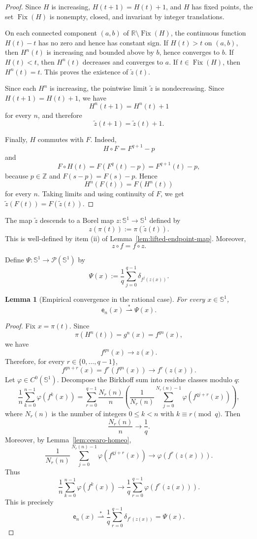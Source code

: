 \documentclass[12pt,a4paper,twoside]{article}
\theoremstyle{plain}
\newtheorem{lemma}[theorem]{Lemma}
\theoremstyle{definition}
\newcommand{\cP}{{\mathcal P}}
\newcommand{\emp}{\mathsf e}
\newcommand{\wto}{\overset{*}{\rightharpoonup}}
\begin{document}
\begin{proof}
Since \(H\) is increasing, \(H(t+1)=H(t)+1\), and \(H\) has fixed points,
the set \(\operatorname{Fix}(H)\) is nonempty, closed, and invariant by
integer translations.

On each connected component \((a,b)\) of
\(\mathbb R\setminus\operatorname{Fix}(H)\), the continuous function
\(H(t)-t\) has no zero and hence has constant sign. If \(H(t)>t\) on
\((a,b)\), then \(H^n(t)\) is increasing and bounded above by \(b\), hence
converges to \(b\). If \(H(t)<t\), then \(H^n(t)\) decreases and converges to
\(a\). If \(t\in\operatorname{Fix}(H)\), then \(H^n(t)=t\). This proves the
existence of \(\widetilde z(t)\).

Since each \(H^n\) is increasing, the pointwise limit \(\widetilde z\) is
nondecreasing. Since \(H(t+1)=H(t)+1\), we have
\[
H^n(t+1)=H^n(t)+1
\]
for every \(n\), and therefore
\[
\widetilde z(t+1)=\widetilde z(t)+1.
\]

Finally, \(H\) commutes with \(F\). Indeed,
\[
H\circ F=F^{q+1}-p
\]
and
\[
F\circ H(t)=F(F^q(t)-p)=F^{q+1}(t)-p,
\]
because \(p\in\mathbb Z\) and \(F(s-p)=F(s)-p\). Hence
\[
H^n(F(t))=F(H^n(t))
\]
for every \(n\). Taking limits and using continuity of \(F\), we get $\widetilde z(F(t))=F(\widetilde z(t))$. \end{proof}

The map \(\widetilde z\) descends to a Borel map $z:\mathbb S^1\to\mathbb S^1$ defined by
\[
z(\pi(t)):=\pi(\widetilde z(t)).
\]
This is well-defined by item (ii) of Lemma~\ref{lem:lifted-endpoint-map}.
Moreover,
\[
z\circ f=f\circ z.
\]

Define $\Psi:\mathbb S^1\to\cP(\mathbb S^1)$ by
\[
\Psi(x):=\frac1q\sum_{j=0}^{q-1}\delta_{f^j(z(x))}.
\]

\begin{lemma}[Empirical convergence in the rational case]
\label{lem:rational-empirical-convergence}
For every \(x\in\mathbb S^1\),
\[
\emp_n(x)\wto \Psi(x).
\]
\end{lemma}

\begin{proof}
Fix \(x=\pi(t)\). Since
\[
\pi(H^n(t))=g^n(x)=f^{qn}(x),
\]
we have
\[
f^{qn}(x)\longrightarrow z(x).
\]
Therefore, for every \(r\in\{0,\dots,q-1\}\),
\[
f^{qn+r}(x)
=
f^r(f^{qn}(x))
\longrightarrow
f^r(z(x)).
\]
Let \(\varphi\in C^0(\mathbb S^1)\). Decompose the Birkhoff sum into residue
classes modulo \(q\):
\[
\frac1n\sum_{k=0}^{n-1}\varphi(f^k(x))
=
\sum_{r=0}^{q-1}
\frac{N_r(n)}{n}
\left(
\frac1{N_r(n)}
\sum_{j=0}^{N_r(n)-1}
\varphi(f^{qj+r}(x))
\right),
\]
where \(N_r(n)\) is the number of integers \(0\le k<n\) with
\(k\equiv r\pmod q\). Then
\[
\frac{N_r(n)}{n}\longrightarrow \frac1q.
\]
Moreover, by Lemma~\ref{lem:cesaro-homeo},
\[
\frac1{N_r(n)}
\sum_{j=0}^{N_r(n)-1}
\varphi(f^{qj+r}(x))
\longrightarrow
\varphi(f^r(z(x))).
\]
Thus
\[
\frac1n\sum_{k=0}^{n-1}\varphi(f^k(x))
\longrightarrow
\frac1q\sum_{r=0}^{q-1}\varphi(f^r(z(x))).
\]
This is precisely
\[
\emp_n(x)\wto \frac1q\sum_{r=0}^{q-1}\delta_{f^r(z(x))}
=\Psi(x).
\]
\end{proof}
\end{document}
